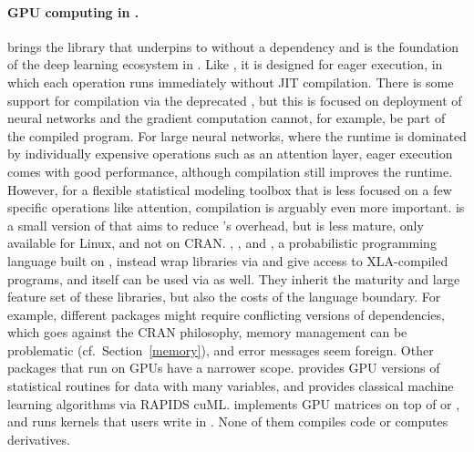 \documentclass[article,shortnames]{jss}
\begin{document}
\paragraph{GPU computing in .}
 \citep{ref-rtorch} brings the  library that underpins  to  without a  dependency and is the foundation of the deep learning ecosystem in .
Like , it is designed for eager execution, in which each operation runs immediately without JIT compilation.
There is some support for compilation via the deprecated , but this is focused on deployment of neural networks and the gradient computation cannot, for example, be part of the compiled program.
For large neural networks, where the runtime is dominated by individually expensive operations such as an attention layer, eager execution comes with good performance, although compilation still improves the runtime.
However, for a flexible statistical modeling toolbox that is less focused on a few specific operations like attention, compilation is arguably even more important.
 \citep{ref-tinytorch} is a small version of  that aims to reduce 's overhead, but is less mature, only available for Linux, and not on CRAN.
 \citep{ref-r-tensorflow},  \citep{ref-keras3}, and  \citep{ref-greta}, a probabilistic programming language built on  \citep{ref-tfp}, instead wrap  libraries via  and give access to XLA-compiled programs, and  itself can be used via  as well.
They inherit the maturity and large feature set of these libraries, but also the costs of the language boundary.
For example, different  packages might require conflicting versions of  dependencies, which goes against the CRAN philosophy, memory management can be problematic (cf.~Section~\ref{memory}), and error messages seem foreign.
Other  packages that run on GPUs have a narrower scope.
 \citep{ref-gputools} provides GPU versions of statistical routines for data with many variables, and  \citep{ref-cudaml} provides classical machine learning algorithms via RAPIDS cuML.
 \citep{ref-gpumatrix} implements GPU matrices on top of  or , and  \citep{ref-opencl-r} runs kernels that users write in .
None of them compiles  code or computes derivatives.
\end{document}
